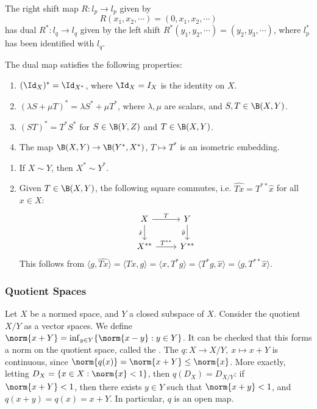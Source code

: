 \documentclass[a4paper]{article}
\begin{document}
\begin{eg}
  The right shift map $R:l_p\to l_p$ given by
  \[
    R(x_1,x_2,\cdots)=(0,x_1,x_2,\cdots)
  \]
  has dual $R^*:l_q\to l_q$ given by the left shift $R^*(y_1,y_2,\cdots)=(y_2,y_3,\cdots)$, where $l_p^*$ has been identified with $l_q$.
\end{eg}

The dual map satisfies the following properties:
\begin{enumerate}[label=(\arabic*)]
  \item $(\Id_X)^*=\Id_{X^*}$, where $\Id_X=I_X$ is the identity on $X$.
  \item $(\lambda S+\mu T)^*=\lambda S^*+\mu T^*$, where $\lambda,\mu$ are scalars, and $S,T\in\B(X,Y)$.
  \item $(ST)^*=T^*S^*$ for $S\in\B(Y,Z)$ and $T\in\B(X,Y)$.
  \item The map $\B(X,Y)\to\B(Y^*,X^*)$, $T\mapsto T^*$ is an isometric embedding.
\end{enumerate}

\begin{remark}
  \begin{enumerate}[label=(\arabic*)]
    \item If $X\sim Y$, then $X^*\sim Y^*$.
    \item Given $T\in\B(X,Y)$, the following square commutes, i.e. $\widehat{Tx}=T^{**}\hat{x}$ for all $x\in X$:
    \[
      \begin{tikzcd}
        X \arrow[r, "T"] \arrow[d, "\hat{x}"'] & Y \arrow[d, "\hat{y}"'] \\
        X^{**} \arrow[r, "T^{**}"]& Y^{**}
      \end{tikzcd}
	 \]
    This follows from $\langle g,\widehat{Tx}\rangle=\langle Tx,g\rangle=\langle x,T^*g\rangle=\langle T^*g,\hat{x}\rangle=\langle g,T^{**}\hat{x}\rangle$.
  \end{enumerate}
\end{remark}

\subsubsection*{Quotient Spaces}
Let $X$ be a normed space, and $Y$ a closed subspace of $X$. Consider the quotient $X/Y$ as a vector spaces. We define $\norm{x+Y}=\inf_{y\in Y}\{\norm{x-y}:y\in Y\}$. It can be checked that this forms a norm on the quotient space, called the . The  $q:X\to X/Y,\ x\mapsto x+Y$ is continuous, since $\norm{q(x)}=\norm{x+Y}\leq\norm{x}$. More exactly, letting $D_X=\{x\in X:\norm{x}<1\}$, then $q(D_X)=D_{X/Y}$: if $\norm{x+Y}<1$, then there exists $y\in Y$ such that $\norm{x+y}<1$, and $q(x+y)=q(x)=x+Y$. In particular, $q$ is an open map.
\end{document}
